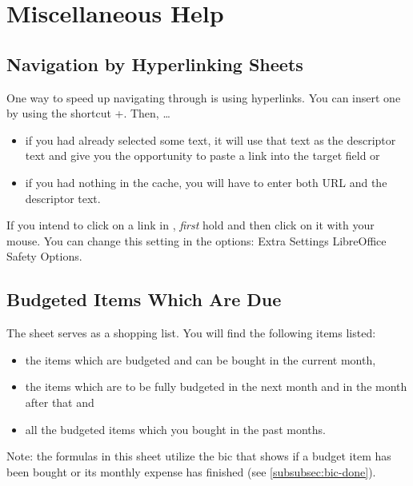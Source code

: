 \section{Miscellaneous Help}
\label{sec:miscellaneous-help}

\subsection{Navigation by Hyperlinking Sheets}
\label{subsec:navigation-hyperlinking-sheets}

One way to speed up navigating through \tfn is using hyperlinks.
You can insert one by using the shortcut +.
Then, \ldots
\begin{itemize}
	\item if you had already selected some text, it will use that text as the descriptor text and give you the opportunity to paste a link into the target field or
	\item if you had nothing in the cache, you will have to enter both URL and the descriptor text.
\end{itemize}

If you intend to click on a link in \loc, \emph{first} hold  and then click on it with your mouse.
You can change this setting in the options: Extra \structurenext Settings \structurenext LibreOffice \structurenext Safety \structurenext Options.

\subsection{Budgeted Items Which Are Due}
\label{subsec:budgeted-items-which-are-due}

The sheet  serves as a shopping list.
You will find the following items listed:
\begin{itemize}
	\item the items which are budgeted and can be bought in the current month,
	\item the items which are to be fully budgeted in the next month and in the month after that and
	\item all the budgeted items which you bought in the past months.
\end{itemize}

Note: the formulas in this sheet utilize the \ac{bic}  that shows if a budget item has been bought or its monthly expense has finished (see \autoref{subsubsec:bic-done}).

